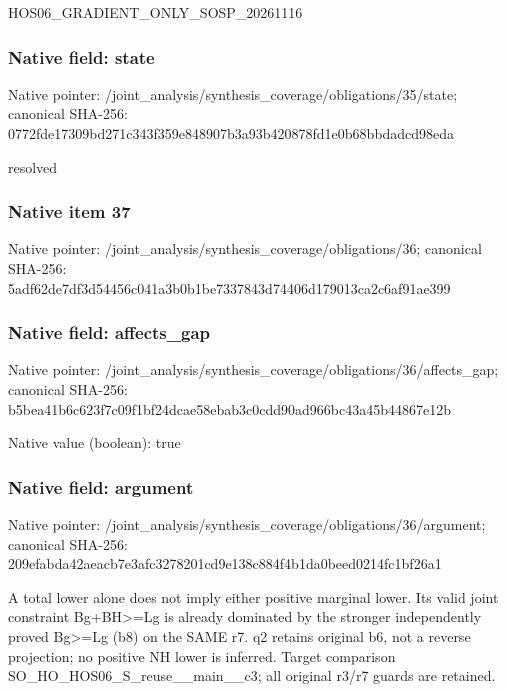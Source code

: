 \documentclass[10pt,a4paper]{article}
\begin{document}
\begingroup\raggedright\sloppy HOS06\_\allowbreak{}GRADIENT\_\allowbreak{}ONLY\_\allowbreak{}SOSP\_\allowbreak{}20261116\par\endgroup

\subsubsection{Native field: state}
Native pointer: /joint\_\allowbreak{}analysis/synthesis\_\allowbreak{}coverage/obligations/35/state; canonical SHA-256: 0772fde17309bd271c343f359e848907b3a93b420878fd1e0b68bbdadcd98eda

\begingroup\raggedright\sloppy resolved\par\endgroup

\subsubsection{Native item 37}
Native pointer: /joint\_\allowbreak{}analysis/synthesis\_\allowbreak{}coverage/obligations/36; canonical SHA-256: 5adf62de7df3d54456c041a3b0b1be7337843d74406d179013ca2c6af91ae399

\subsubsection{Native field: affects\_\allowbreak{}gap}
Native pointer: /joint\_\allowbreak{}analysis/synthesis\_\allowbreak{}coverage/obligations/36/affects\_\allowbreak{}gap; canonical SHA-256: b5bea41b6c623f7c09f1bf24dcae58ebab3c0cdd90ad966bc43a45b44867e12b

Native value (boolean): true

\subsubsection{Native field: argument}
Native pointer: /joint\_\allowbreak{}analysis/synthesis\_\allowbreak{}coverage/obligations/36/argument; canonical SHA-256: 209efabda42aeacb7e3afc3278201cd9e138c884f4b1da0beed0214fc1bf26a1

\begingroup\raggedright\sloppy A total lower alone does not imply either positive marginal lower. Its valid joint constraint Bg+BH>=\allowbreak{}Lg is already dominated by the stronger independently proved Bg>=\allowbreak{}Lg (b8) on the SAME r7. q2 retains original b6,\allowbreak{} not a reverse projection;\allowbreak{} no positive NH lower is inferred. Target comparison SO\_\allowbreak{}HO\_\allowbreak{}HOS06\_\allowbreak{}S\_\allowbreak{}reuse\_\allowbreak{}\_\allowbreak{}main\_\allowbreak{}\_\allowbreak{}c3;\allowbreak{} all original r3/\allowbreak{}r7 guards are retained.\par\endgroup
\end{document}
